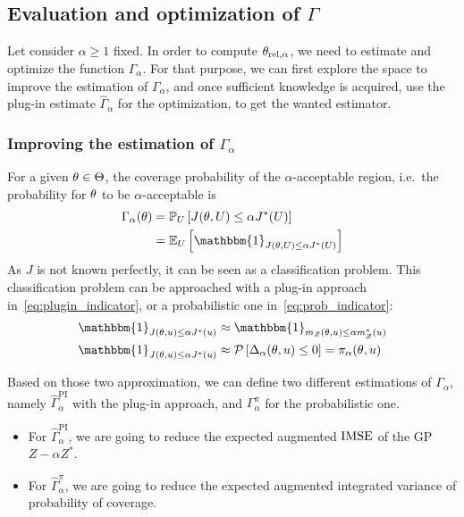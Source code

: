 \documentclass[../../Main_ManuscritThese.tex]{subfiles}
\begin{document}
\subsection{Evaluation and optimization of $\Gamma$}
Let consider $\alpha\geq 1$ fixed. In order to compute ${\theta}_{\mathrm{rel, \alpha}}$, we need to estimate and optimize the function $\Gamma_{\alpha}$. For that purpose, we can first explore the space to improve the estimation of $\Gamma_{\alpha}$, and once sufficient knowledge is acquired, use the plug-in estimate $\hat{\Gamma}_{\alpha}$ for the optimization, to get the wanted estimator.
\subsubsection{Improving the estimation of $\Gamma_{\alpha}$}

For a given $\theta\in\Theta$, the coverage probability of the $\alpha$-acceptable region, i.e.\ the probability for $\theta$ to be $\alpha$-acceptable is
\begin{align}
  \Gamma_{\alpha}(\kk) &= \Prob_{U}\left[J(\kk,\UU) \leq \alpha J^*(\UU)\right] \\
                              & =\Ex_{U}\left[\mathbbm{1}_{J(\kk,\UU) \leq \alpha J^*(\UU)}\right]
\end{align}
As $J$ is not known perfectly, it can be seen as a classification problem.
This classification problem can be approached with a plug-in approach in~\cref{eq:plugin_indicator}, or a probabilistic one in~\cref{eq:prob_indicator}:
\begin{align}
  \mathbbm{1}_{J(\kk,\uu) \leq \alpha J^*(\uu)} &\approx   \mathbbm{1}_{m_Z(\kk,\uu) \leq \alpha m_Z^*(\uu)} \label{eq:plugin_indicator} \\
  \mathbbm{1}_{J(\kk,\uu) \leq \alpha J^*(\uu)} &\approx   \ProbGP\left[ \Delta_{\alpha}(\kk,\uu) \leq 0 \right] = \pi_{\alpha}(\kk,\uu) \label{eq:prob_indicator}
\end{align}

Based on those two approximation, we can define two different estimations of $\Gamma_\alpha$, namely $\hat{\Gamma}_\alpha^{\mathrm{PI}}$ with the plug-in approach, and $\Gamma_{\alpha}^{\pi}$ for the probabilistic one.
\begin{itemize}
\item For $\hat{\Gamma}_{\alpha}^{\mathrm{PI}}$, we are going to reduce the expected augmented $\operatorname{\mathrm{IMSE}}$ of the GP $Z - \alpha Z^*$.
\item For $\hat{\Gamma}_{\alpha}^{\pi}$, we are going to reduce the expected augmented integrated variance of probability of coverage.
\end{itemize}
\end{document}
